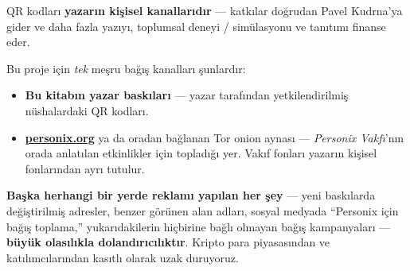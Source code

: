 \begin{minipage}[t]{0.60\textwidth}
\vspace{0pt}
\begin{mdframed}[
  linewidth=0.7pt,roundcorner=5pt,
  innerleftmargin=10pt,innerrightmargin=10pt,
  innertopmargin=8pt,innerbottommargin=8pt,
  skipabove=0pt,skipbelow=0pt,
  linecolor=cbwarning!50,backgroundcolor=cbwarning!5,
  nobreak=true,
  needspace=4\baselineskip,
]
\footnotesize
QR kodları \textbf{yazarın kişisel kanallarıdır} --- katkılar doğrudan Pavel Kudrna'ya gider ve daha fazla yazıyı, toplumsal deneyi / simülasyonu ve tanıtımı finanse eder.

\smallskip
Bu proje için \emph{tek} meşru bağış kanalları şunlardır:

\smallskip
\begin{itemize}
\setlength{\itemsep}{0pt}
\setlength{\topsep}{0pt}
\item \textbf{Bu kitabın yazar baskıları} --- yazar tarafından yetkilendirilmiş nüshalardaki QR kodları.
\item \href{https://personix.org}{\textbf{personix.org}} ya da oradan bağlanan Tor onion aynası --- \emph{Personix Vakfı}'nın orada anlatılan etkinlikler için topladığı yer. Vakıf fonları yazarın kişisel fonlarından ayrı tutulur.
\end{itemize}

\smallskip
\textbf{Başka herhangi bir yerde reklamı yapılan her şey} --- yeni baskılarda değiştirilmiş adresler, benzer görünen alan adları, sosyal medyada ``Personix için bağış toplama,'' yukarıdakilerin hiçbirine bağlı olmayan bağış kampanyaları --- \textbf{büyük olasılıkla dolandırıcılıktır}. Kripto para piyasasından ve katılımcılarından kasıtlı olarak uzak duruyoruz.
\end{mdframed}
\end{minipage}

\clearpage
